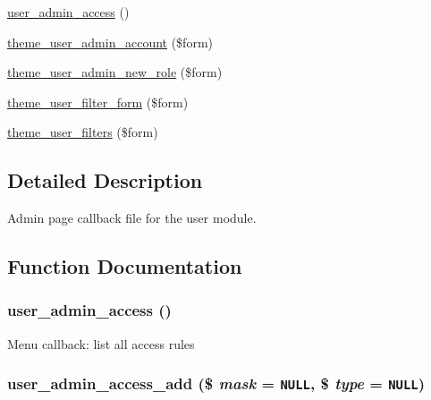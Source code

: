 \begin{CompactItemize}
\item 
\hyperlink{user_8admin_8inc_7c97f1cf49b44d79d7ce5369b485abfd}{user\_\-admin\_\-access} ()
\item 
\hyperlink{group__themeable_g637d49c0b74dae1daf92d089b4dbed58}{theme\_\-user\_\-admin\_\-account} (\$form)
\item 
\hyperlink{group__themeable_g5bd193ccf822945c67e66021b0f2df9d}{theme\_\-user\_\-admin\_\-new\_\-role} (\$form)
\item 
\hyperlink{group__themeable_g1efb227ccf11a707c5f8ebb2443ba4ee}{theme\_\-user\_\-filter\_\-form} (\$form)
\item 
\hyperlink{group__themeable_gcd04cb8ff61ecb42564cf48635cf61a9}{theme\_\-user\_\-filters} (\$form)
\end{CompactItemize}


\subsection{Detailed Description}
Admin page callback file for the user module. 

\subsection{Function Documentation}
\hypertarget{user_8admin_8inc_7c97f1cf49b44d79d7ce5369b485abfd}{
\subsubsection[{user\_\-admin\_\-access}]{\setlength{\rightskip}{0pt plus 5cm}user\_\-admin\_\-access ()}}
\label{user_8admin_8inc_7c97f1cf49b44d79d7ce5369b485abfd}


Menu callback: list all access rules \hypertarget{user_8admin_8inc_e95f2dfc6d335639b68daa040ca773ef}{
\subsubsection[{user\_\-admin\_\-access\_\-add}]{\setlength{\rightskip}{0pt plus 5cm}user\_\-admin\_\-access\_\-add (\$ {\em mask} = {\tt NULL}, \/  \$ {\em type} = {\tt NULL})}}
\label{user_8admin_8inc_e95f2dfc6d335639b68daa040ca773ef}


